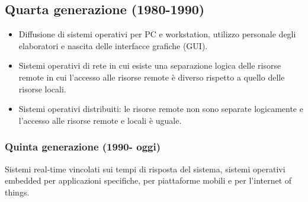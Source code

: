 \subsection{Quarta generazione (1980-1990)}
\begin{itemize}
	\item Diffusione di sistemi operativi per PC e workstation, utilizzo personale degli elaboratori e nascita delle interfacce grafiche (GUI).
	\item Sistemi operativi di rete in cui esiste una separazione logica delle risorse remote in cui l'accesso alle risorse remote \`e diverso rispetto a quello
	      delle risorse locali.
	\item Sistemi operativi distribuiti: le risorse remote non sono separate logicamente e l'accesso alle risorse remote e locali \`e uguale.
\end{itemize}
\subsubsection{Quinta generazione (1990- oggi)}
Sistemi real-time vincolati sui tempi di risposta del sistema, sistemi operativi embedded per applicazioni specifiche, per piattaforme mobili e per
l'internet of things.
